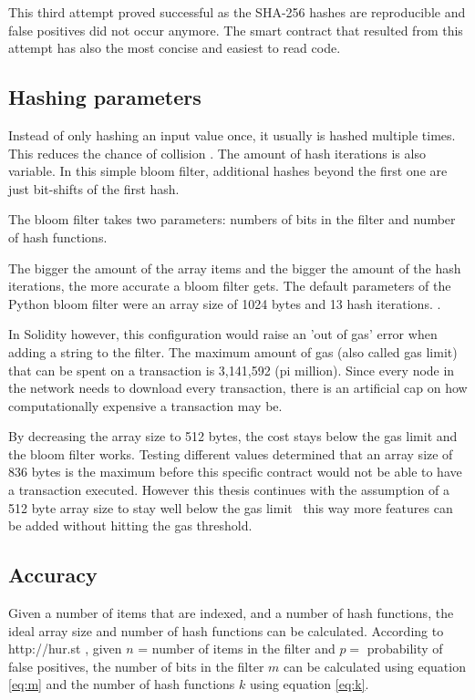 This third attempt proved successful as the SHA-256 hashes are reproducible and false positives did not occur anymore. The smart contract that resulted from this attempt has also the most concise and easiest to read code.

\subsection{Hashing parameters}

Instead of only hashing an input value once, it usually is hashed multiple times. This reduces the chance of collision \cite{MultipleHashes}. The amount of hash iterations is also variable. In this simple bloom filter, additional hashes beyond the first one are just bit-shifts of the first hash.

The bloom filter takes two parameters: numbers of bits in the filter and number of hash functions. 

The bigger the amount of the array items and the bigger the amount of the hash iterations, the more accurate a bloom filter gets. The default parameters of the Python bloom filter were an array size of 1024 bytes and 13 hash iterations. \cite{SimpleBloomFilter}.

In Solidity however, this configuration would raise an 'out of gas' error when adding a string to the filter. 
The maximum amount of gas (also called gas limit) that can be spent on a transaction is 3,141,592 (pi million). Since every node in the network needs to download every transaction, there is an artificial cap on how computationally expensive a transaction may be.

By decreasing the array size to 512 bytes, the cost stays below the gas limit and the bloom filter works. 
Testing different values determined that an array size of 836 bytes is the maximum before this specific contract would not be able to have a transaction executed. However this thesis continues with the assumption of a 512 byte array size to stay well below the gas limit \textemdash \ this way more features can be added without hitting the gas threshold.

\subsection{Accuracy}

Given a number of items that are indexed, and a number of hash functions, the ideal array size and number of hash functions can be calculated. According to http://hur.st \cite{BloomfilterAccuracy}, given $n$ = number of items in the filter and $p =$ probability of false positives, the number of bits in the filter $m$ can be calculated using equation \ref{eq:m} and the number of hash functions $k$ using equation \ref{eq:k}. 


